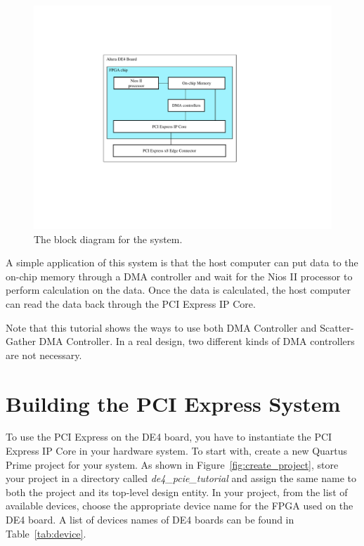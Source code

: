 \documentclass[11pt, twoside, pdftex]{article}
\begin{document}
\begin{figure}[H]
	\centering
	  \includegraphics[scale=1]{figures/system_block_diagram.pdf}
	\caption{The block diagram for the system.} 
	\label{fig:system_block_diagram}
\end{figure}

A simple application of this system is that the host computer can put data to the on-chip memory through a DMA controller and wait for the Nios II processor to perform calculation on the data. Once the data is calculated, the host computer can read the data back through the PCI Express IP Core.

Note that this tutorial shows the ways to use both DMA Controller and Scatter-Gather DMA Controller. In a real design, two different kinds of DMA controllers are not necessary. 

\newpage
\section{Building the PCI Express System}
To use the PCI Express on the DE4 board, you have to instantiate the PCI Express IP Core in your hardware system. To start with, create a new Quartus Prime project for your system. As shown in Figure~\ref{fig:create_project}, store your project in a directory called {\it de4\_pcie\_tutorial} and assign the same name to both the project and its top-level design entity. In your project, from the list of available devices, choose the appropriate device name for the FPGA used on the DE4 board. A list of devices names of DE4 boards can be found in Table~\ref{tab:device}.
\end{document}
